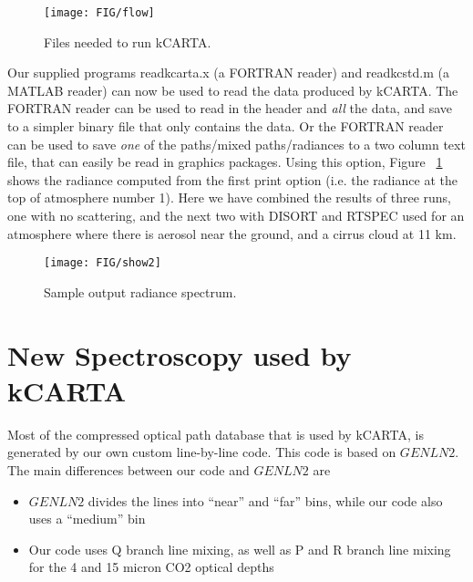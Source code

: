 \documentclass[12pt]{article}
\newcommand{\kc}{\textsf{kCARTA}\xspace}
\begin{document}
\begin{figure}
\texttt{[image: FIG/flow]}
\caption{Files needed to run \kc.}
\end{figure}

Our supplied programs {\sf readkcarta.x} (a {\sf FORTRAN} reader) and
{\sf readkcstd.m} (a {\sf MATLAB} reader) can now be used to read the
data produced by \kc.  The {\sf FORTRAN} reader can be used to read in
the header and {\em all} the data, and save to a simpler binary file
that only contains the data.  Or the {\sf FORTRAN} reader can be used
to save {\em one} of the paths/mixed paths/radiances to a two column
text file, that can easily be read in graphics packages.  Using this
option, Figure ~\ref{sampleplot} shows the radiance computed from the
first print option (i.e. the radiance at the top of atmosphere number 1).
Here we have combined the results of three runs, one with no scattering, and
the next two with DISORT and RTSPEC used for an atmosphere where there is
aerosol near the ground, and a cirrus cloud at 11 km.

\begin{figure}
\texttt{[image: FIG/show2]}
\caption{Sample output radiance spectrum.}
\label{sampleplot}
\end{figure}


\section{New Spectroscopy used by \kc}
Most of the compressed optical path database that is used by \kc, is generated
by our own custom line-by-line code. This code is based on $GENLN2$. The main
differences between our code and $GENLN2$ are
\begin{itemize}
\item $GENLN2$ divides the lines into ``near'' and ``far'' bins, while our
      code also uses a ``medium'' bin
\item Our code uses Q branch line mixing, as well as P and R branch line mixing
      for the 4 and 15 micron CO2 optical depths
\end{itemize}
\end{document}
